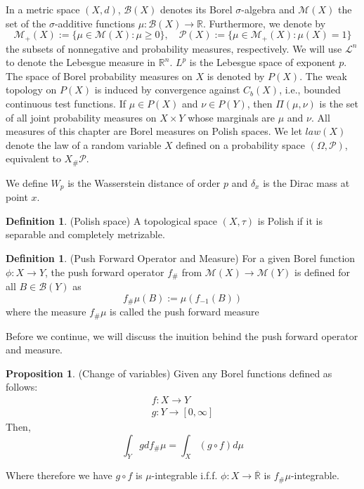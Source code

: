 \documentclass{Dissertate}
\theoremstyle{definition}
\newtheorem{proposition}[theorem]{Proposition}
\theoremstyle{definition} %
\theoremstyle{definition}
\newtheorem{definition}[theorem]{Definition}
\begin{document}


In a metric space $(X, d)$, $\mathcal{B}(X)$ denotes its Borel $\sigma$-algebra and $\mathcal{M}(X)$ the set of the $\sigma$-additive functions $\mu : \mathcal{B}(X) \to \mathbb{R}$. Furthermore, we denote by
\[
\mathcal{M}_+(X) := \{ \mu \in \mathcal{M}(X) : \mu \geq 0 \}, \quad \mathcal{P}(X) := \{ \mu \in \mathcal{M}_+(X) : \mu(X) = 1 \}
\]
the subsets of nonnegative and probability measures, respectively. We will use $\mathcal{L}^n$ to denote the Lebesgue measure in $\mathbb{R}^n$. $L^p$ is the Lebesgue space of exponent $p$.
The space of Borel probability measures on $X$ is denoted by $P(X)$. The weak topology on $P(X)$ is induced by convergence against $C_b(X)$, i.e., bounded continuous test functions. If $\mu \in P(X)$ and $\nu \in P(Y)$, then $\Pi(\mu, \nu)$ is the set of all joint probability measures on $X \times Y$ whose marginals are $\mu$ and $\nu$.
All measures of this chapter are Borel measures on Polish spaces.  We let $law(X)$ denote the law of a random variable $X$ defined on a probability space $(\Omega, \mathcal{P})$, equivalent to $X_{\#}\mathcal{P}$.

We define $W_p$ is the Wasserstein distance of order $p$ and $\delta_x$ is the Dirac mass at point $x$.

\begin{definition} (Polish space)
A topological space $(X, \tau )$ is Polish if it is
separable and completely metrizable.     
\end{definition}
\begin{definition} (Push Forward Operator and Measure) 
For a given Borel function $\phi: X \rightarrow Y$, the push forward operator $f_{\#}$ from $\mathcal{M}(X) \rightarrow \mathcal{M}(Y)$ is defined for all $B \in \mathcal{B}(Y)$ as
$$
f_{\#}\mu(B) := \mu(f_{-1}(B))
$$
where the measure $f_{\#}\mu$ is called the push forward measure
\end{definition}
Before we continue, we will discuss the inuition behind the push forward operator and measure. 
\begin{proposition}(Change of variables) \cite{lecturesOT} Given any Borel functions defined as follows:  
\begin{align*}
    f: X \rightarrow Y \\
    g: Y \rightarrow [0, \infty ]
\end{align*}
Then, 
$$
\int_Y gd f_{\#}\mu = \int_X (g \circ f)d\mu
$$
\end{proposition} 
Where therefore we have $g \circ f$ is $\mu$-integrable i.f.f. $\phi: X \rightarrow \overline{\mathbb{R}}$ is $f_{\#}\mu$-integrable.
\end{document}

